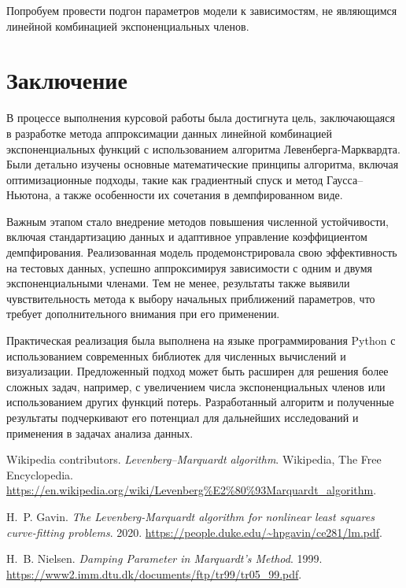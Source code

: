 Попробуем провести подгон параметров модели к зависимостям, не являющимся линейной комбинацией экспоненциальных членов.

\newpage
\section*{Заключение}

В процессе выполнения курсовой работы была достигнута цель, заключающаяся в разработке метода аппроксимации данных линейной комбинацией экспоненциальных функций с использованием алгоритма Левенберга-Марквардта. Были детально изучены основные математические принципы алгоритма, включая оптимизационные подходы, такие как градиентный спуск и метод Гаусса–Ньютона, а также особенности их сочетания в демпфированном виде.

Важным этапом стало внедрение методов повышения численной устойчивости, включая стандартизацию данных и адаптивное управление коэффициентом демпфирования. Реализованная модель продемонстрировала свою эффективность на тестовых данных, успешно аппроксимируя зависимости с одним и двумя экспоненциальными членами. Тем не менее, результаты также выявили чувствительность метода к выбору начальных приближений параметров, что требует дополнительного внимания при его применении.

Практическая реализация была выполнена на языке программирования Python с использованием современных библиотек для численных вычислений и визуализации. Предложенный подход может быть расширен для решения более сложных задач, например, с увеличением числа экспоненциальных членов или использованием других функций потерь. Разработанный алгоритм и полученные результаты подчеркивают его потенциал для дальнейших исследований и применения в задачах анализа данных.

\newpage

\begin{thebibliography}{99}
	Wikipedia contributors.
	\emph{Levenberg--Marquardt algorithm}.
	Wikipedia, The Free Encyclopedia.
	\url{https://en.wikipedia.org/wiki/Levenberg%E2%80%93Marquardt_algorithm}.

	H.~P. Gavin.
	\emph{The Levenberg-Marquardt algorithm for nonlinear least squares curve-fitting problems}.
	2020.
	\url{https://people.duke.edu/~hpgavin/ce281/lm.pdf}.

	H.~B. Nielsen.
	\emph{Damping Parameter in Marquardt's Method}.
	1999.
	\url{https://www2.imm.dtu.dk/documents/ftp/tr99/tr05_99.pdf}.
\end{thebibliography}

